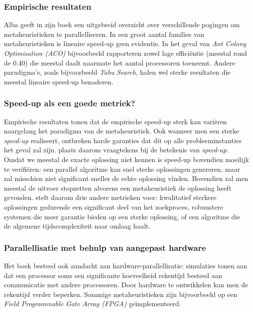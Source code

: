 \subsubsection{Empirische resultaten}

Alba geeft in zijn boek een uitgebreid overzicht over verschillende pogingen om metaheuristieken te parallelliseren. In een groot aantal families van metaheuristieken is lineaire speed-up geen evidentie. In het geval van \emph{Ant Colony Optimisation (ACO)} bijvoorbeeld rapporteren zowel \cite{alba8-42,alba8-38,alba8-7,alba8-16} lage effici\"entie (meestal rond de 0.40) die meestal daalt naarmate het aantal processoren toeneemt. Andere paradigma's, zoals bijvoorbeeld \emph{Tabu Search}, halen wel sterke resultaten die meestal lineaire speed-up benaderen.

\subsubsection{Speed-up als een goede metriek?}
Empirische resultaten tonen dat de empirische speed-up sterk kan vari\"eren naargelang het paradigma van de metaheuristiek. Ook wanneer men een sterke \emph{speed-up} realiseert, ontbreken harde garanties dat dit op alle probleeminstanties het geval zal zijn. \cite{crainicAndToulouse} plaats daarom vraagtekens bij de betekenis van \emph{speed-up}. Omdat we meestal de exacte oplossing niet kennen is speed-up bovendien moeilijk te verifi\"eren: een parallel algoritme kan snel sterke oplossingen genereren, maar zal misschien niet significant sneller de echte oplossing vinden. Bovendien zal men meestal de uitvoer stopzetten alvorens een metaheuristiek de oplossing heeft gevonden. \cite{crainicAndToulouse} stelt daarom drie andere metrieken voor: kwalitatief sterkere oplossingen gedurende een significant deel van het zoekproces, robuustere systemen die meer garantie bieden op een sterke oplossing, of een algoritme die de algemene tijdscomplexiteit naar omlaag haalt.

\subsubsection{Parallellisatie met behulp van aangepast hardware}
Het boek besteed ook aandacht aan hardware-parallellisatie: simulaties tonen aan dat een processor soms een significante hoeveelheid rekentijd besteed aan communicatie met andere processoren. Door hardware te ontwikkelen kan men de rekentijd verder beperken. Sommige metaheuristieken zijn bijvoorbeeld op een \emph{Field Programmable Gate Array (FPGA)} ge\"implementeerd\cite{conf/glvlsi/HaldarNCB00,conf/fpt/GuntschMSDESS02,journals/gpem/Martin01}.